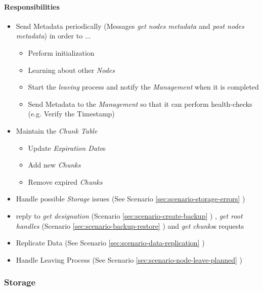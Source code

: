 \paragraph{Responsibilities}

\begin{itemize}
    \item Send Metadata periodically (Messages \emph{get nodes metadata} and \emph{post nodes metadata}) in order to ...
    \begin{itemize}
        \item Perform initialization
        \item Learning about other \emph{Nodes}
        \item Start the \emph{leaving} process and notify the \emph{Management} when it is completed
        \item Send Metadata to the \emph{Management} so that it can perform health-checks (e.g. Verify the Timestamp)
    \end{itemize}
    \item Maintain the \emph{Chunk Table}
    \begin{itemize}
        \item Update \emph{Expiration Date}s
        \item Add new \emph{Chunks}
        \item Remove expired \emph{Chunks}
    \end{itemize}
    \item Handle possible \emph{Storage} issues (See Scenario \ref{sec:scenario-storage-errors} )
    \item reply to \emph{get designation}  (Scenario \ref{sec:scenario-create-backup} ) , \emph{get root handles} (Scenario \ref{sec:scenario-backup-restore} ) and \emph{get chunks}s requests
    \item Replicate Data (See Scenario \ref{sec:scenario-data-replication} )
    \item Handle Leaving Process (See Scenario \ref{sec:scenario-node-leave-planned} )
\end{itemize}

\label{sec:component-storage}
\subsubsection{Storage}

